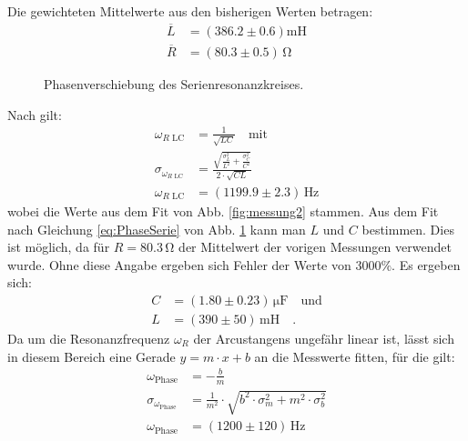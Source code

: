 \documentclass[12pt,a4paper,titlepage,headinclude,bibtotoc]{scrartcl}
\begin{document}
Die gewichteten Mittelwerte aus den bisherigen Werten betragen:
\begin{align*}
\overline L&=(386.2 \pm 0.6)\si{\milli\henry}\\
\overline R&=(80.3 \pm 0.5)\,\si{\ohm}
\end{align*}
\begin{figure}[!htb]
	\centering
	
	\caption{Phasenverschiebung des Serienresonanzkreises.}
	\label{fig:phase}
\end{figure}
Nach \cite[S. 954]{tipler} gilt: 
\begin{align*}
\omega_{R\text{ LC}}&=\frac{1}{\sqrt{LC}}\quad \text{mit}\\
\sigma_{\omega_{R\text{ LC}}}&=\frac{\sqrt{\frac{\sigma_{L}^{2}}{L^{2}} + \frac{\sigma_{C}^{2}}{C^{2}}}}{2 \cdot \sqrt{CL}}\\
\omega_{R\text{ LC}}&=(1199.9 \pm 2.3)\,\si{\hertz}
\end{align*}
wobei die Werte aus dem Fit von Abb. \ref{fig:messung2} stammen.
Aus dem Fit nach Gleichung \eqref{eq:PhaseSerie} von Abb. \ref{fig:phase} kann man $L$ und $C$ bestimmen.
Dies ist möglich, da für $R=80.3\,\si\ohm$ der Mittelwert der vorigen Messungen verwendet wurde.
Ohne diese Angabe ergeben sich Fehler der Werte von $3000\%$.
Es ergeben sich:
\begin{align*}
C&= (1.80 \pm 0.23)\,\si{\micro\farad}\quad\text{und}\\ 
L&= (390\pm 50)\,\si{\milli\henry}\quad .
\end{align*}
Da um die Resonanzfrequenz $\omega_R$ der Arcustangens ungefähr linear ist, lässt sich in diesem Bereich eine Gerade $y=m\cdot x+b$ an die Messwerte fitten, für die gilt:
\begin{align*}
\omega_\text{Phase}&=- \frac{b}{m}\\
\sigma_{\omega_\text{Phase}}&=\frac{1}{m^{2}} \cdot \sqrt{b^{2} \cdot \sigma_{m}^{2} + m^{2} \cdot \sigma_{b}^{2}}\\
\omega_\text{Phase}&=(1200 \pm 120)\,\si\hertz
\end{align*}
\end{document}
